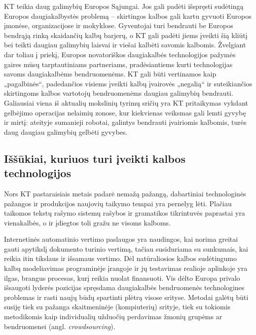 \begin{multicols}{2}
KT teikia daug galimybių Europos Sąjungai. Jos gali padėti išspręsti sudėtingą Europos daugiakalbystės problemą – skirtingos kalbos gali kartu gyvuoti Europos įmonėse, organizacijose ir mokyklose. Gyventojai turi bendrauti be Europos bendrąją rinką skaidančių kalbų barjerų, o KT gali padėti jiems įveikti šią  kliūtį bei teikti daugiau galimybių laisvai ir viešai kalbėti savomis kalbomis. Žvelgiant dar toliau į priekį, Europos novatoriškos daugiakalbės technologijos pažymės gaires mūsų tarptautiniams partneriams, pradėsiantiems kurti technologijas savoms daugiakalbėms bendruomenėms. KT gali būti vertinamos kaip „pagalbinės“, padedančios visiems įveikti kalbų įvairovės „negalią“ ir suteikiančios skirtingoms kalbos vartotojų bendruomenėms daugiau galimybių bendrauti. Galiausiai viena iš aktualių mokslinių tyrimų sričių yra KT pritaikymas vykdant gelbėjimo operacijas nelaimių zonose, kur kiekvienas veiksmas gali lemti gyvybę ir mirtį: ateityje sumanieji robotai, galintys bendrauti įvairiomis kalbomis, turės daug daugiau galimybių gelbėti gyvybes. 

\subsection{Iššūkiai, kuriuos turi įveikti kalbos technologijos}

Nors KT pastaraisiais metais padarė nemažą pažangą, dabartiniai technologinės pažangos ir produkcijos naujovių taikymo tempai yra pernelyg lėti. Plačiau taikomos tekstų rašymo sistemų rašybos ir gramatikos tikrintuvės paprastai yra vienakalbės, o ir įdiegtos toli gražu ne visoms kalboms.


Internetinės automatinio vertimo paslaugos yra naudingos, kai norima greitai gauti apytikslį dokumento turinio vertimą, tačiau susiduriama su sunkumais, kai reikia itin tikslaus ir išsamaus vertimo. Dėl natūraliosios kalbos sudėtingumo kalbų modeliavimas programinėje įrangoje ir jų testavimas realioje aplinkoje yra ilgas, brangus procesas, kurį reikia nuolat finansuoti. Vis dėlto Europa privalo išsaugoti lyderės pozicijas spręsdama daugiakalbės bendruomenės technologines problemas ir rasti naujų būdų spartinti plėtrą visose srityse. Metodai galėtų būti susiję tiek su pažanga skaitmeninėje (kompiuterių) srityje, tiek su tokiomis metodikomis kaip individualių užduočių perdavimas žmonių grupėms ar bendruomenei (angl. \textit{crowdsourcing}).


\end{multicols}
